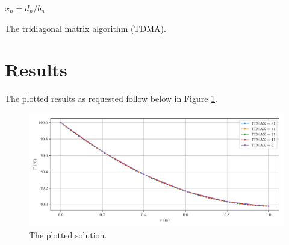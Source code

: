 \documentclass{article}
\begin{document}
\begin{algorithm}[H]
	$x_n = d_n / b_n$\;
	\caption{The tridiagonal matrix algorithm (TDMA).}
	\label{alg:tdma}
\end{algorithm}

\section*{Results}

The plotted results as requested follow below in Figure \ref{fig:results}.

\begin{figure}[H]
	\centering
	\includegraphics[width=\linewidth]{../python/result}
	\caption{The plotted solution.}
	\label{fig:results}
\end{figure}
\end{document}
